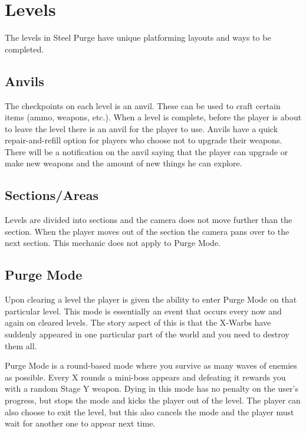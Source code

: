 \documentclass[../Main.tex]{subfiles}
\begin{document}
\section{Levels}

The levels in Steel Purge have unique platforming layouts and ways to be completed.

\subsection{Anvils}

The checkpoints on each level is an anvil. These can be used to craft certain items (ammo, weapons, etc.). When a level is complete, before the player is about to leave the level there is an anvil for the player to use. Anvils have a quick repair-and-refill option for players who choose not to upgrade their weapons. There will be a notification on the anvil saying that the player can upgrade or make new weapons and the amount of new things he can explore.

\subsection{Sections/Areas}

Levels are divided into sections and the camera does not move further than the section. When the player moves out of the section the camera pans over to the next section. This mechanic does not apply to Purge Mode.

\subsection{Purge Mode}

Upon clearing a level the player is given the ability to enter Purge Mode on that particular level. This mode is essentially an event that occurs every now and again on cleared levels. The story aspect of this is that the X-Warbs have suddenly appeared in one particular part of the world and you need to destroy them all.

Purge Mode is a round-based mode where you survive as many waves of enemies as possible. Every X rounds a mini-boss appears and defeating it rewards you with a random Stage Y weapon. Dying in this mode has no penalty on the user's progress, but stops the mode and kicks the player out of the level. The player can also choose to exit the level, but this also cancels the mode and the player must wait for another one to appear next time.
\end{document}
